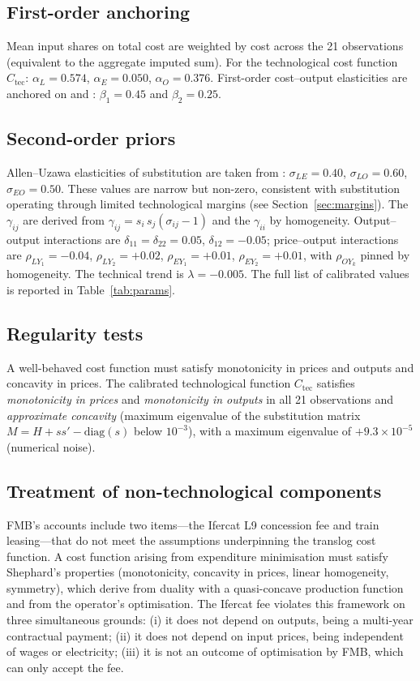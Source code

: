 \documentclass[11pt,a4paper]{article}
\begin{document}
\subsection{First-order anchoring}
Mean input shares on total cost are weighted by cost across the 21
observations (equivalent to the aggregate imputed sum). For the
technological cost function $C_{\text{tec}}$:
$\alpha_L = 0.574$, $\alpha_E = 0.050$, $\alpha_O = 0.376$.
First-order cost--output elasticities are anchored on
\citet{savage1997} and \citet{graham2008}: $\beta_1 = 0.45$ and
$\beta_2 = 0.25$.

\subsection{Second-order priors}
Allen--Uzawa elasticities of substitution are taken from
\citet{wheat2015}: $\sigma_{LE}=0.40$, $\sigma_{LO}=0.60$,
$\sigma_{EO}=0.50$. These values are narrow but non-zero, consistent
with substitution operating through limited technological margins
(see Section~\ref{sec:margins}). The $\gamma_{ij}$ are derived from
$\gamma_{ij}=s_i\,s_j(\sigma_{ij}-1)$ and the $\gamma_{ii}$ by
homogeneity. Output--output interactions are
$\delta_{11}=\delta_{22}=0.05$, $\delta_{12}=-0.05$; price--output
interactions are $\rho_{LY_1}=-0.04$, $\rho_{LY_2}=+0.02$,
$\rho_{EY_1}=+0.01$, $\rho_{EY_2}=+0.01$, with $\rho_{OY_k}$ pinned by
homogeneity. The technical trend is $\lambda=-0.005$. The full list of
calibrated values is reported in Table~\ref{tab:params}.

\subsection{Regularity tests}
A well-behaved cost function must satisfy monotonicity in prices and
outputs and concavity in prices. The calibrated technological function
$C_{\text{tec}}$ satisfies \emph{monotonicity in prices} and
\emph{monotonicity in outputs} in all 21 observations and
\emph{approximate concavity} (maximum eigenvalue of the substitution
matrix $M = H + ss' - \text{diag}(s)$ below $10^{-3}$), with a maximum
eigenvalue of $+9.3\times 10^{-5}$ (numerical noise).

\subsection{Treatment of non-technological components}
\label{sec:treatment}

FMB's accounts include two items---the Ifercat L9 concession fee and train
leasing---that do not meet the assumptions underpinning the translog cost
function. A cost function arising from expenditure minimisation must
satisfy Shephard's \citeyearpar{shephard1953} properties (monotonicity,
concavity in prices, linear homogeneity, symmetry), which derive from
duality with a quasi-concave production function and from the operator's
optimisation. The Ifercat fee violates this framework on three
simultaneous grounds: (i) it does not depend on outputs, being a
multi-year contractual payment; (ii) it does not depend on input prices,
being independent of wages or electricity; (iii) it is not an outcome of
optimisation by FMB, which can only accept the fee.
\end{document}

